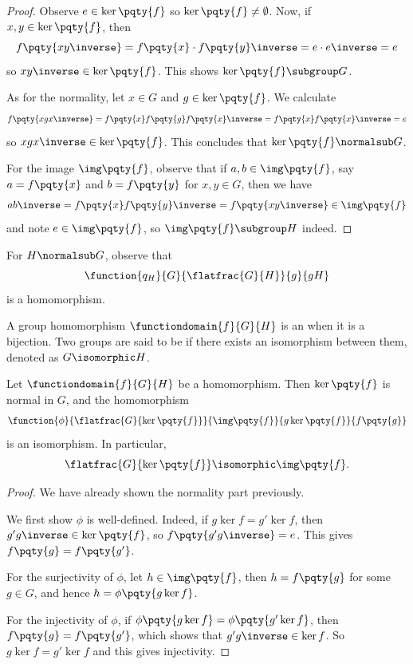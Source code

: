 \begin{proof}
    Observe \(e \in \ker\pqty{f}\) so \(\ker\pqty{f} \neq \emptyset\). Now, if \(x, y \in \ker\pqty{f}\), then
    \[
        f\pqty{x y \inverse} = f\pqty{x} \cdot f\pqty{y}\inverse = e \cdot e\inverse = e
    \]
    so \(x y \inverse \in \ker \pqty{f}\). This shows \(\ker \pqty{f} \subgroup G\).

    As for the normality, let \(x \in G\) and \(g \in \ker \pqty{f}\). We calculate
    \[
        f\pqty{x g x\inverse} = f\pqty{x} f\pqty{g} f\pqty{x}\inverse = f\pqty{x} f\pqty{x}\inverse = e
    \]
    so \(x g x\inverse \in \ker \pqty{f}\). This concludes that \(\ker \pqty{f} \normalsub G\).

    For the image \(\img \pqty{f}\), observe that if \(a, b \in \img\pqty{f}\), say \(a = f\pqty{x}\) and \(b = f\pqty{y}\) for \(x, y \in G\), then we have
    \[
        a b \inverse = f\pqty{x} f\pqty{y}\inverse = f\pqty{x y \inverse} \in \img \pqty{f}
    \]
    and note \(e \in \img \pqty{f}\), so \(\img \pqty{f} \subgroup H\) indeed.
\end{proof}

\begin{remark}
    For \(H \normalsub G\), observe that
    \[
        \function{q_H}{G}{\flatfrac{G}{H}}{g}{gH}
    \]
    is a homomorphism.
\end{remark}

\begin{definition}
    \label{def:group-isomorphism}%
    A group homomorphism \(\functiondomain{f}{G}{H}\) is an  when it is a bijection. Two groups are said to be  if there exists an isomorphism between them, denoted as \(G \isomorphic H\).
\end{definition}

\begin{theorem}
    \label{thm:first-isomorphism-theorem-groups}%
    Let \(\functiondomain{f}{G}{H}\) be a homomorphism. Then \(\ker \pqty{f}\) is normal in \(G\), and the homomorphism 
    \[
        \function{\phi}{\flatfrac{G}{\ker \pqty{f}}}{\img \pqty{f}}{g \ker \pqty{f}}{f\pqty{g}}
    \]
    is an isomorphism. In particular,
    \[
        \flatfrac{G}{\ker \pqty{f}} \isomorphic \img \pqty{f}.
    \]
\end{theorem}

\begin{proof}
    We have already shown the normality part previously.

    We first show \(\phi\) is well-defined. Indeed, if \(g \ker f = g' \ker f\), then \(g' g\inverse \in \ker \pqty{f}\), so \(f\pqty{g' g\inverse} = e\). This gives \(f\pqty{g} = f\pqty{g'}\).

    For the surjectivity of \(\phi\), let \(h \in \img \pqty{f}\), then \(h = f \pqty{g}\) for some \(g \in G\), and hence \(h = \phi\pqty{g \ker f}\).

    For the injectivity of \(\phi\), if \(\phi\pqty{g \ker f} = \phi\pqty{g' \ker f}\), then \(f\pqty{g} = f\pqty{g'}\), which shows that \(g' g\inverse \in \ker f\). So \(g \ker f = g' \ker f\) and this gives injectivity.
\end{proof}

